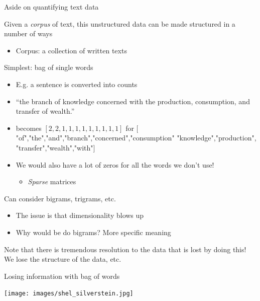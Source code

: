 \documentclass[notes,11pt, aspectratio=169]{beamer}
\newenvironment{wideitemize}{\itemize\addtolength{\itemsep}{10pt}}{\enditemize}
\begin{document}
\begin{frame}{Aside on quantifying text data }
  \begin{wideitemize}
  \item Given a \emph{corpus} of text, this unstructured data can be made structured in a number of ways
    \begin{itemize}
    \item Corpus: a collection of written texts
    \end{itemize}
  \item Simplest: bag of single words
    \begin{itemize}
    \item E.g. a sentence is converted into counts
    \item ``the branch of knowledge concerned with the production, consumption, and transfer of wealth.''
    \item becomes $[2, 2, 1, 1, 1, 1, 1, 1, 1, 1, 1]$ for $[$"of","the","and","branch","concerned","consumption" "knowledge","production", "transfer","wealth","with"$]$
    \item We would also have a lot of zeros for all the words we don't use!
      \begin{itemize}
      \item \emph{Sparse} matrices
      \end{itemize}
    \end{itemize}
  \item Can consider bigrams, trigrams, etc.
    \begin{itemize}
    \item The issue is that dimensionality blows up
    \item Why would be do bigrams? More specific meaning
    \end{itemize}
  \item Note that there is tremendous resolution to the data that is
    lost by doing this! We lose the structure of the data, etc.
  \end{wideitemize}
\end{frame}

\begin{frame}{Losing information with bag of words}
  \begin{center}
    \texttt{[image: images/shel\_silverstein.jpg]}
  \end{center}
\end{frame}
\end{document}
